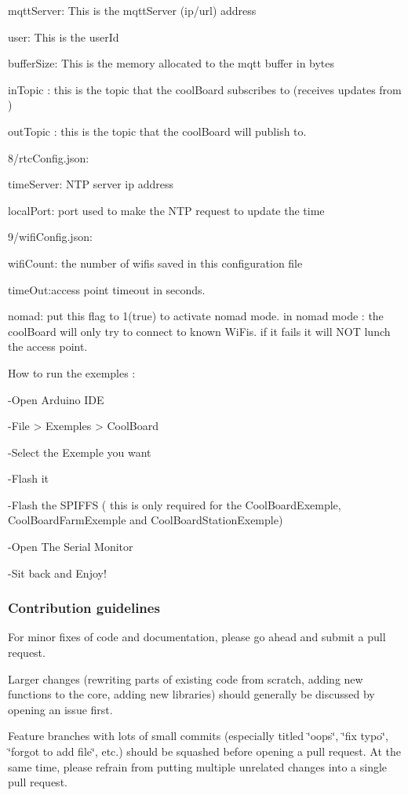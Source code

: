 mqtt\+Server\+: This is the mqtt\+Server (ip/url) address

user\+: This is the user\+Id

buffer\+Size\+: This is the memory allocated to the mqtt buffer in bytes

in\+Topic \+: this is the topic that the cool\+Board subscribes to (receives updates from )

out\+Topic \+: this is the topic that the cool\+Board will publish to.

8/rtc\+Config.\+json\+:

time\+Server\+: N\+TP server ip address

local\+Port\+: port used to make the N\+TP request to update the time

9/wifi\+Config.\+json\+:

wifi\+Count\+: the number of wifis saved in this configuration file

time\+Out\+:access point timeout in seconds.

nomad\+: put this flag to 1(true) to activate nomad mode. in nomad mode \+: the cool\+Board will only try to connect to known Wi\+Fis. if it fails it will N\+OT lunch the access point.

How to run the exemples \+: \begin{DoxyVerb}-Open Arduino IDE 

-File > Exemples > CoolBoard

-Select the Exemple you want

-Flash it

-Flash the SPIFFS ( this is only required for the CoolBoardExemple, CoolBoardFarmExemple and CoolBoardStationExemple)

-Open The Serial Monitor

-Sit back and Enjoy!
\end{DoxyVerb}


\subsubsection*{Contribution guidelines}

For minor fixes of code and documentation, please go ahead and submit a pull request.

Larger changes (rewriting parts of existing code from scratch, adding new functions to the core, adding new libraries) should generally be discussed by opening an issue first.

Feature branches with lots of small commits (especially titled \char`\"{}oops\char`\"{}, \char`\"{}fix typo\char`\"{}, \char`\"{}forgot to add file\char`\"{}, etc.) should be squashed before opening a pull request. At the same time, please refrain from putting multiple unrelated changes into a single pull request.

